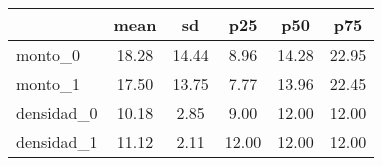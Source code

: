 {
\def\sym#1{\ifmmode^{#1}\else\(^{#1}\)\fi}
\begin{tabular}{l*{1}{ccccc}}
\toprule
                    &        mean&          sd&         p25&         p50&         p75\\
\midrule
monto\_0             &       18.28&       14.44&        8.96&       14.28&       22.95\\
monto\_1             &       17.50&       13.75&        7.77&       13.96&       22.45\\
densidad\_0          &       10.18&        2.85&        9.00&       12.00&       12.00\\
densidad\_1          &       11.12&        2.11&       12.00&       12.00&       12.00\\
\bottomrule
\end{tabular}
}
